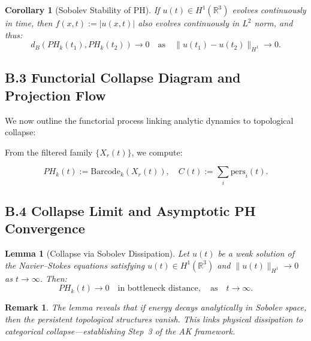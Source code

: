 \documentclass[11pt]{article}
\newtheorem{remark}[theorem]{Remark}
\newtheorem{lemma}[theorem]{Lemma}
\newtheorem{corollary}[theorem]{Corollary}
\begin{document}
\begin{corollary}[Sobolev Stability of PH]
If $u(t) \in H^1(\mathbb{R}^3)$ evolves continuously in time, then $f(x,t) := |u(x,t)|$ also evolves continuously in $L^2$ norm, and thus:
\[
d_B(PH_k(t_1), PH_k(t_2)) \to 0 \quad \text{as} \quad \|u(t_1) - u(t_2)\|_{H^1} \to 0.
\]
\end{corollary}



\subsection*{B.3 Functorial Collapse Diagram and Projection Flow}

We now outline the functorial process linking analytic dynamics to topological collapse:

\begin{center}
\end{center}

From the filtered family $\{X_r(t)\}$, we compute:

\[
PH_k(t) := \mathrm{Barcode}_k(X_r(t)),
\quad C(t) := \sum_i \text{pers}_i(t).
\]



\subsection*{B.4 Collapse Limit and Asymptotic PH Convergence}

\begin{lemma}[Collapse via Sobolev Dissipation]
Let $u(t)$ be a weak solution of the Navier–Stokes equations satisfying $u(t) \in H^1(\mathbb{R}^3)$ and $\|u(t)\|_{H^1} \to 0$ as $t \to \infty$. Then:
\[
PH_k(t) \to 0 \quad \text{in bottleneck distance}, \quad \text{as} \quad t \to \infty.
\]
\end{lemma}

\begin{remark}
The lemma reveals that if energy decays analytically in Sobolev space, then the persistent topological structures vanish. This links physical dissipation to categorical collapse—establishing Step~3 of the AK framework.
\end{remark}
\end{document}

